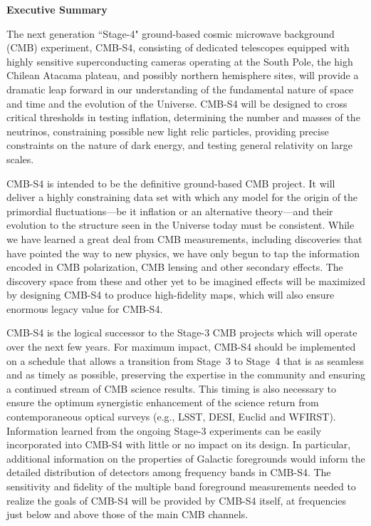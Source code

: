 \begin{center}
  {\Large \bf Executive Summary}
\end{center}

The next generation ``Stage-4" ground-based cosmic microwave background (CMB) experiment, CMB-S4, consisting of dedicated telescopes equipped with highly sensitive superconducting cameras operating at the South Pole, the high Chilean Atacama plateau, and possibly northern hemisphere sites, will provide a dramatic leap forward in our understanding of the fundamental nature of space and time and the evolution of the Universe. CMB-S4 will be designed to cross critical thresholds in testing inflation, determining the number and masses of the neutrinos, constraining possible new light relic particles, providing precise constraints on the nature of dark energy, and testing general relativity on large scales. 

CMB-S4 is intended to be the definitive ground-based CMB project. It will deliver a highly constraining data set with which any model for the origin of the primordial fluctuations---be it inflation or an alternative theory---and their evolution to the structure seen in the Universe today must be consistent.   
While we have learned a great deal from CMB measurements, including discoveries that have pointed the way to new physics, we have only begun to tap the information encoded in CMB polarization, CMB lensing and other secondary effects.  The discovery space from these and other yet to be imagined effects will be  maximized by designing CMB-S4 to produce high-fidelity maps, which will also ensure enormous legacy value for CMB-S4.



CMB-S4 is the logical successor to the Stage-3 CMB projects which will operate over the next few years. For maximum impact, CMB-S4 should be implemented on a schedule that allows a transition from Stage~3 to Stage~4 that is as seamless and as timely as possible, preserving the expertise in the community and ensuring a continued stream of CMB science results. This timing is also necessary to ensure the optimum synergistic enhancement of the science return from contemporaneous optical surveys (e.g., LSST, DESI, Euclid and WFIRST).   Information learned from the ongoing Stage-3 experiments can be easily incorporated into CMB-S4 with little or no impact on its design. In particular, additional information on the properties of Galactic foregrounds would inform  the detailed distribution of detectors among frequency bands in CMB-S4.  
The sensitivity and fidelity of the multiple band foreground measurements needed to realize the goals of CMB-S4 will be provided by CMB-S4 itself, at frequencies just below and above those of the main CMB channels. 


